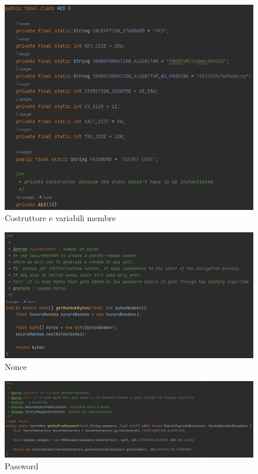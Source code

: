 \begin{figure}[H]
	\centering
	\includegraphics[width=1\textwidth, height=1\textheight, keepaspectratio]{./images/code/java/constructor_and_member_variables.PNG}
	\caption{Costruttore e variabili membre}
	\label{fig:constructor_and_member_variables}
\end{figure}

\textsf{\small } %

\begin{figure}[H]
	\centering
	\includegraphics[width=1\textwidth, height=1\textheight, keepaspectratio]{./images/code/java/nonce_getRandomBytes.PNG}
	\caption{Nonce}
	\label{fig:nonce_getRandomBytes}
\end{figure}

\textsf{\small } %

\begin{figure}[H]
	\centering
	\includegraphics[width=1\textwidth, height=1\textheight, keepaspectratio]{./images/code/java/getKeyFromPassword.PNG}
	\caption{Password}
	\label{fig:getKeyFromPassword}
\end{figure}

